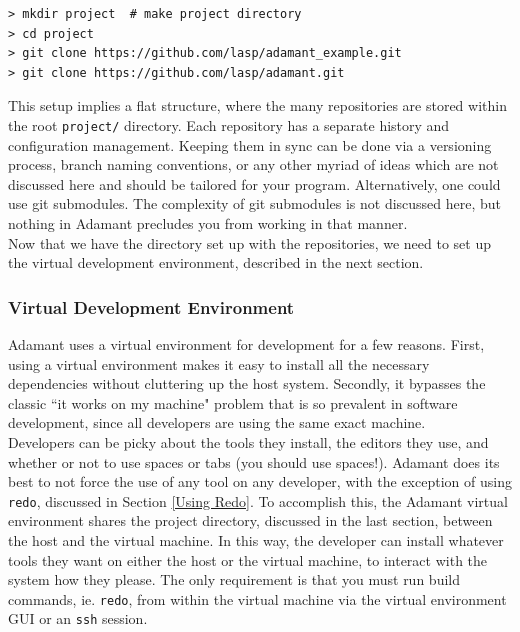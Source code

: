 \vspace{5mm} %
\begin{verbatim}
> mkdir project  # make project directory
> cd project
> git clone https://github.com/lasp/adamant_example.git
> git clone https://github.com/lasp/adamant.git
\end{verbatim}
\vspace{5mm} %

This setup implies a flat structure, where the many repositories are stored within the root \texttt{project/} directory. Each repository has a separate history and configuration management. Keeping them in sync can be done via a versioning process, branch naming conventions, or any other myriad of ideas which are not discussed here and should be tailored for your program. Alternatively, one could use git submodules. The complexity of git submodules is not discussed here, but nothing in Adamant precludes you from working in that manner. \\

Now that we have the directory set up with the repositories, we need to set up the virtual development environment, described in the next section.

\subsubsection{Virtual Development Environment} \label{Virtual Development Environment}

Adamant uses a virtual environment for development for a few reasons. First, using a virtual environment makes it easy to install all the necessary dependencies without cluttering up the host system. Secondly, it bypasses the classic ``it works on my machine" problem that is so prevalent in software development, since all developers are using the same exact machine. \\

Developers can be picky about the tools they install, the editors they use, and whether or not to use spaces or tabs (you should use spaces!). Adamant does its best to not force the use of any tool on any developer, with the exception of using \texttt{redo}, discussed in Section \ref{Using Redo}. To accomplish this, the Adamant virtual environment shares the project directory, discussed in the last section, between the host and the virtual machine. In this way, the developer can install whatever tools they want on either the host or the virtual machine, to interact with the system how they please. The only requirement is that you must run build commands, ie. \texttt{redo}, from within the virtual machine via the virtual environment GUI or an \texttt{ssh} session. \\

